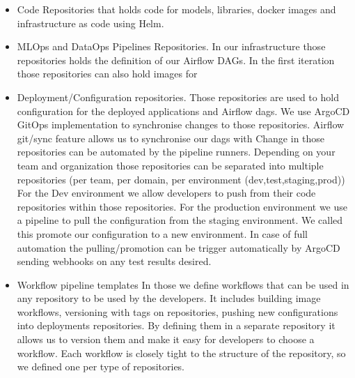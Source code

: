 \begin{itemize}
    \item Code Repositories that holds code for models, libraries, docker images and infrastructure as code using Helm.
    \item MLOps and DataOps Pipelines Repositories.
    In our infrastructure those repositories holds the definition of our Airflow DAGs.
    In the first iteration those repositories can also hold images for
    \item Deployment/Configuration repositories.
    Those repositories are used to hold configuration for the deployed applications and Airflow dags.
    We use ArgoCD GitOps implementation to synchronise changes to those repositories.
    Airflow git/sync feature allows us to synchronise our dags with
    Change in those repositories can be automated by the pipeline runners.
    Depending on your team and organization those repositories can be separated into multiple repositories (per team, per domain, per environment (dev,test,staging,prod))
    For the Dev environment we allow developers to push from their code repositories within those repositories.
    For the production environment we use a pipeline to pull the configuration from the staging environment.
    We called this promote our configuration to a new environment.
    In case of full automation the pulling/promotion can be trigger automatically by ArgoCD sending webhooks on any test results desired.
    \item Workflow pipeline templates
    In those we define workflows that can be used in any repository to be used by the developers.
    It includes building image workflows, versioning with tags on repositories, pushing new configurations into deployments repositories.
    By defining them in a separate repository it allows us to version them and make it easy for developers to choose a workflow.
    Each workflow is closely tight to the structure of the repository, so we defined one per type of repositories.
\end{itemize}

